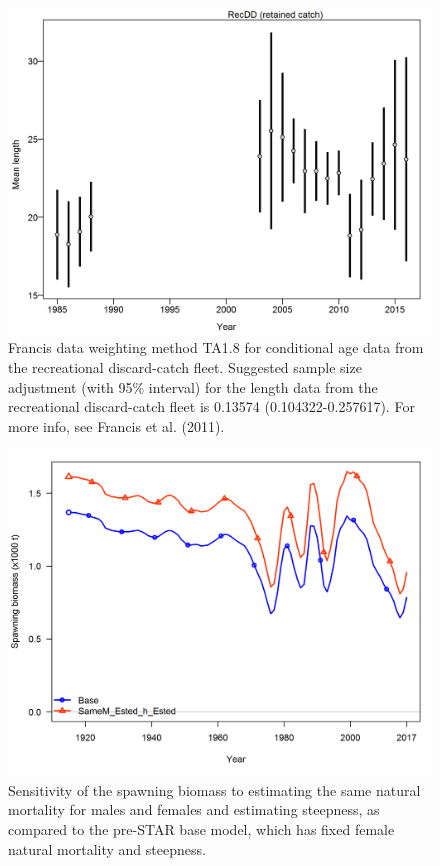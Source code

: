 \documentclass[12pt,]{article}
\begin{document}
\begin{figure}[htbp]
\centering
\includegraphics{r4ss/plots_mod1/comp_lendat_data_weighting_TA1.8_RecDD.png}
\caption{Francis data weighting method TA1.8 for conditional age data
from the recreational discard-catch fleet. Suggested sample size
adjustment (with 95\% interval) for the length data from the
recreational discard-catch fleet is 0.13574 (0.104322-0.257617). For
more info, see Francis et al. (2011).
\label{fig:comp_lendat_data_weighting_TA1.8_RecDD}}
\end{figure}

\FloatBarrier

\begin{figure}[htbp]
\centering
\includegraphics{Figures/sensitivity_spawnbio.png}
\caption{Sensitivity of the spawning biomass to estimating the same
natural mortality for males and females and estimating steepness, as
compared to the pre-STAR base model, which has fixed female natural
mortality and steepness. \label{fig:sensitivity_spawnbio}}
\end{figure}
\end{document}
